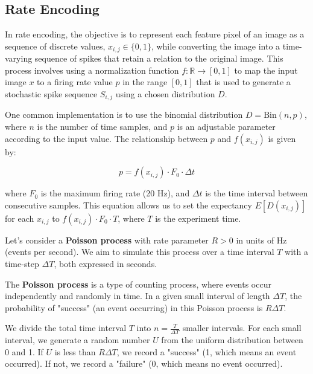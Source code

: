 \subsection{Rate Encoding} \label{ssec:rate-encoding}

In rate encoding, the objective is to represent each feature pixel of an image as a sequence of discrete values, \(x_{i,j} \in \{0, 1\}\), while converting the image into a time-varying sequence of spikes that retain a relation to the original image. This process involves using a normalization function \(f: \mathbb{R} \rightarrow [0, 1]\) to map the input image \(x\) to a firing rate value \(p\) in the range \([0, 1]\) that is used to generate a stochastic spike sequence \(S_{i,j}\) using a chosen distribution \(D\).

One common implementation is to use the binomial distribution \(D = \text{Bin}(n, p)\), where \(n\) is the number of time samples, and \(p\) is an adjustable parameter according to the input value. The relationship between \(p\) and \(f(x_{i,j})\) is given by:

\begin{equation} \label{eq:rate-enc-prob}
    p = f(x_{i,j}) \cdot F_0 \cdot \Delta t 
\end{equation}

where \(F_0\) is the maximum firing rate (20 Hz), and \(\Delta t\) is the time interval between consecutive samples. This equation allows us to set the expectancy \(E[D(x_{i,j})]\) for each \(x_{i,j}\) to \(f(x_{i,j}) \cdot F_0 \cdot T\), where \(T\) is the experiment time.

Let's consider a \textbf{Poisson process} with rate parameter $R > 0$ in units of Hz (events per second). We aim to simulate this process over a time interval $T$ with a time-step $\Delta T$, both expressed in seconds.

The \textbf{Poisson process} is a type of counting process, where events occur independently and randomly in time. In a given small interval of length $\Delta T$, the probability of "success" (an event occurring) in this Poisson process is $R \Delta T$.

We divide the total time interval $T$ into $n = \frac{T}{\Delta T}$ smaller intervals. For each small interval, we generate a random number $U$ from the uniform distribution between 0 and 1. If $U$ is less than $R \Delta T$, we record a "success" (1, which means an event occurred). If not, we record a "failure" (0, which means no event occurred).

